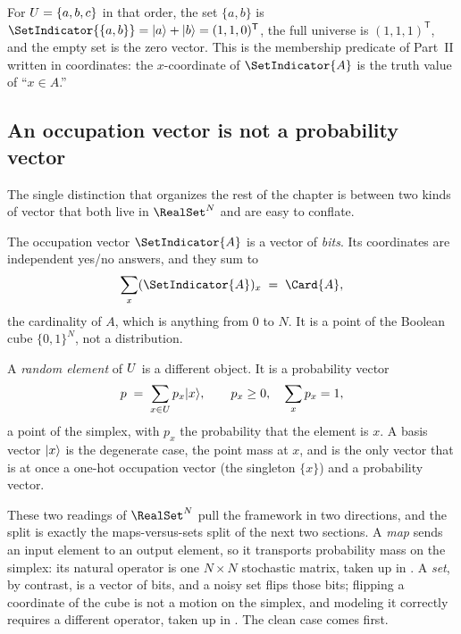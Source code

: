 For $U = \{a, b, c\}$ in that order, the set $\{a, b\}$ is
$\SetIndicator{\{a,b\}} = \ket{a} + \ket{b} = (1, 1, 0)^{\mathsf{T}}$, the full
universe is $(1,1,1)^{\mathsf{T}}$, and the empty set is the zero vector. This
is the membership predicate of Part~II written in coordinates: the
$x$-coordinate of $\SetIndicator{A}$ is the truth value of ``$x \in A$.''

\subsection*{An occupation vector is not a probability vector}

The single distinction that organizes the rest of the chapter is between two
kinds of vector that both live in $\RealSet^{N}$ and are easy to conflate.

The occupation vector $\SetIndicator{A}$ is a vector of \emph{bits}. Its
coordinates are independent yes/no answers, and they sum to
\[
  \sum_{x} (\SetIndicator{A})_x \;=\; \Card{A},
\]
the cardinality of $A$, which is anything from $0$ to $N$. It is a point of the
Boolean cube $\{0,1\}^{N}$, not a distribution.

A \emph{random element} of $U$ is a different object. It is a
probability vector
\[
  p \;=\; \sum_{x \in U} p_x \lvert x \rangle,
  \qquad
  p_x \ge 0,
  \quad
  \sum_{x} p_x = 1,
\]
a point of the simplex, with $p_x$ the probability that the element is $x$. A
basis vector $\lvert x \rangle$ is the degenerate case, the point mass at $x$, and is the
only vector that is at once a one-hot occupation vector (the singleton $\{x\}$)
and a probability vector.

These two readings of $\RealSet^{N}$ pull the framework in two directions, and
the split is exactly the maps-versus-sets split of the next two sections. A
\emph{map} sends an input element to an output element, so it transports
probability mass on the simplex: its natural operator is one $N \times N$
stochastic matrix, taken up in . A
\emph{set}, by contrast, is a vector of bits, and a noisy set flips those bits;
flipping a coordinate of the cube is not a motion on the simplex, and modeling
it correctly requires a different operator, taken up in
. The clean case comes first.
